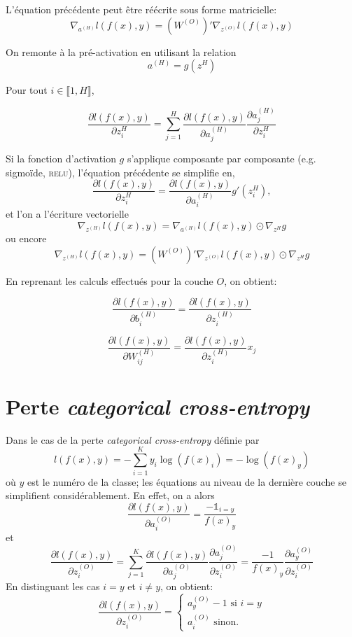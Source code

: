 \documentclass[ebook,10pt,oneside,openany,final, french, a4paper]{memoir}
\begin{document}
\begin{multicols*}{2}[]
L'équation précédente peut être réécrite sous forme matricielle:
\[
\nabla_{a^{(H)}} l(f(x), y) = \left(W^{(O)}\right)' \nabla_{z^{(O)}} l(f(x), y)
\]

On remonte à la pré-activation en utilisant la relation
\[
a^{(H)} = g(z^{H})
\]

Pour tout $i \in \llbracket 1, H \rrbracket$,

\[
\frac{\partial l(f(x), y)}{\partial z^{H}_i}
= \sum_{j=1}^{H} \frac{\partial l(f(x), y)}{\partial a^{(H)}_j}
       \frac{\partial a^{(H)}_j}{\partial z^{H}_i}
\] 

Si la fonction d'activation $g$ s'applique composante par 
composante (e.g.\/ sigmoïde, \textsc{relu}), l'équation précédente 
se simplifie en,
\[
\frac{\partial l(f(x), y)}{\partial z^{H}_i}
= \frac{\partial l(f(x), y)}{\partial a^{(H)}_i} g'(z^{H}_i),
\] 
et l'on a l'écriture vectorielle 
\[
\nabla_{z^{(H)}} l(f(x), y) = \nabla_{a^{(H)}} l(f(x), y) \odot \nabla_{z^{H}} g
\] 
ou encore
\[
\nabla_{z^{(H)}} l(f(x), y) = \left(W^{(O)}\right)' \nabla_{z^{(O)}} l(f(x), y) \odot \nabla_{z^{H}} g
\] 

En reprenant les calculs effectués pour la couche $O$, on obtient:

\[
\frac{\partial l(f(x), y)}{\partial b^{(H)}_i}
= \frac{\partial l(f(x), y)}{\partial z^{(H)}_i}
\] 

\[
\frac{\partial l(f(x), y)}{\partial W^{(H)}_{ij}}
  = \frac{\partial l(f(x), y)}{\partial z^{(H)}_i} x_{j}
\] 


\chapter{Perte \textit{categorical cross-entropy}}

Dans le cas de la perte \textit{categorical cross-entropy} définie par
\[
l(f(x), y) = - \sum_{i = 1}^K y_i \log(f(x)_i) = -\log(f(x)_y)
\]
où $y$ est le numéro de la classe; les équations au niveau de la dernière 
couche se simplifient considérablement.
En effet, on a alors
\[
\frac{\partial l(f(x), y)}{\partial a^{(O)}_i} = \frac{-\mathds{1}_{i=y}}{f(x)_y}
\]
et 
\[
\frac{\partial l(f(x), y)}{\partial z^{(O)}_i}
= \sum_{j=1}^{K} \frac{\partial l(f(x), y)}{\partial a^{(O)}_j}
       \frac{\partial a^{(O)}_j}{\partial z^{(O)}_i}
= \frac{-1}{f(x)_y} \frac{\partial a^{(O)}_y}{\partial z^{(O)}_i}
\] 
En distinguant les cas $i=y$ et $i \neq y$, on obtient:
\[
\frac{\partial l(f(x), y)}{\partial z^{(O)}_i}
= \begin{cases}
 a^{(O)}_y - 1 \text{ si } i = y \\
 a^{(O)}_i \text{ sinon.}
\end{cases}
\] 


\end{multicols*}
\end{document}
